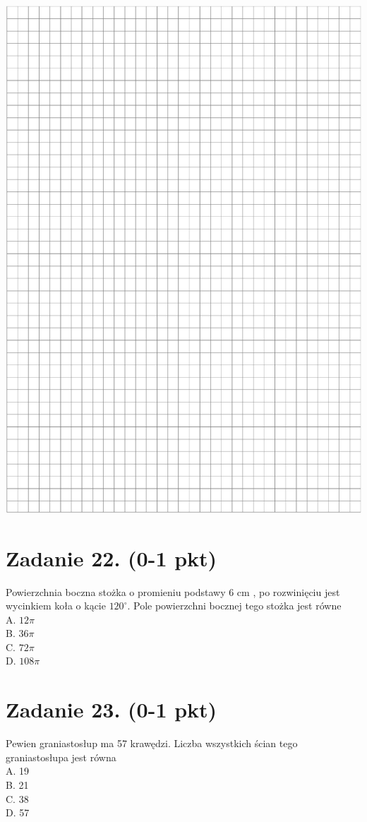 \documentclass[10pt]{article}
\begin{document}
\includegraphics[max width=\textwidth, center]{2024_11_21_997c30e0b98e62837d84g-09}

\section*{Zadanie 22. (0-1 pkt)}
Powierzchnia boczna stożka o promieniu podstawy 6 cm , po rozwinięciu jest wycinkiem koła o kącie \(120^{\circ}\). Pole powierzchni bocznej tego stożka jest równe\\
A. \(12 \pi\)\\
B. \(36 \pi\)\\
C. \(72 \pi\)\\
D. \(108 \pi\)

\section*{Zadanie 23. (0-1 pkt)}
Pewien graniastosłup ma 57 krawędzi. Liczba wszystkich ścian tego graniastosłupa jest równa\\
A. 19\\
B. 21\\
C. 38\\
D. 57
\end{document}
